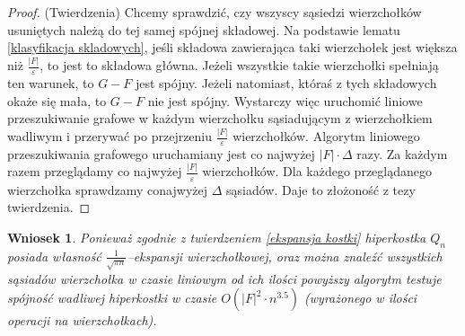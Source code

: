 \documentclass{pracamgr}
\newtheorem{corollary}[theorem]{Wniosek}
\begin{document}
    \begin{proof}
     (Twierdzenia)\newline
     Chcemy sprawdzić, czy wszyscy sąsiedzi wierzchołków usuniętych należą do tej samej spójnej składowej. Na podstawie lematu \ref{klasyfikacja skladowych},
     jeśli składowa zawierająca taki wierzchołek jest większa niż $\frac{|F|}{\varepsilon}$, to jest to składowa główna.
     Jeżeli wszystkie takie wierzchołki spełniają ten warunek, to $G-F$ jest spójny.
     Jeżeli natomiast, któraś z tych składowych okaże się mała, to $G-F$ nie jest spójny.\newline
     Wystarczy więc uruchomić liniowe przeszukiwanie grafowe w każdym wierzchołku sąsiadującym z wierzchołkiem wadliwym i przerywać po przejrzeniu
     $\frac{|F|}{\varepsilon}$ wierzchołków.\newline
     Algorytm liniowego przeszukiwania grafowego uruchamiany jest co najwyżej $|F|\cdot\Delta$ razy.
     Za każdym razem przeglądamy co najwyżej $\frac{|F|}{\varepsilon}$ wierzchołków.
     Dla każdego przeglądanego wierzchołka sprawdzamy conajwyżej $\Delta$ sąsiadów.
     Daje to złożoność z tezy twierdzenia.
    \end{proof}
    \begin{corollary}\label{ekspansywna spojnosc dla kostki}
     Ponieważ zgodnie z twierdzeniem \ref{ekspansja kostki} hiperkostka $Q_n$ posiada własność\newline
     $\frac{1}{\sqrt{\pi n}}$--ekspansji wierzchołkowej,
     oraz można znaleźć wszystkich sąsiadów wierzchołka w czasie liniowym od ich ilości powyższy algorytm testuje spójność wadliwej hiperkostki w czasie
     ${O(|F|^2\cdot n^{3.5})}$ (wyrażonego w ilości operacji na wierzchołkach).
    \end{corollary}
\end{document}
